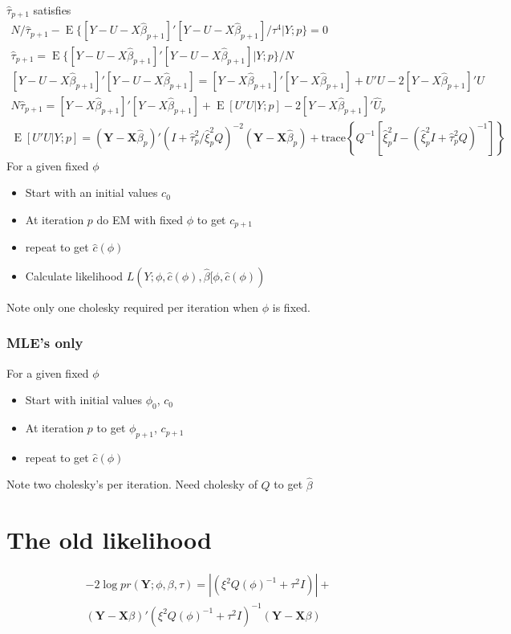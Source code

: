 \documentclass[12pt]{article}
\DeclareMathOperator{\E}{E}
\begin{document}
$\hat\tau_{p+1}$ satisfies
\begin{gather*}
N /\hat\tau_{p+1} -
\E\{[Y-U-X\hat\beta_{p+1}]'[Y-U-X\hat\beta_{p+1}]/\tau^4|Y;p\}=0\\
\hat\tau_{p+1} = \E\{[Y-U-X\hat\beta_{p+1}]'[Y-U-X\hat\beta_{p+1}]|Y;p\}/N\\
[Y-U-X\hat\beta_{p+1}]'[Y-U-X\hat\beta_{p+1}]=
[Y-X\hat\beta_{p+1}]'[Y-X\hat\beta_{p+1}]
+ U'U -2 [Y-X\hat\beta_{p+1}]' U \\
N \hat\tau_{p+1} = [Y-X\hat\beta_{p+1}]'[Y-X\hat\beta_{p+1}]+
\E[U'U|Y;p] - 2 [Y-X\hat\beta_{p+1}]' \hat U_p\\
\E[U'U|Y;p] = (\mathbf{Y} -
\mathbf{X}\hat\beta_p)' ( I + \hat\tau^2_p/\hat\xi^2_p Q  )^{-2}  (\mathbf{Y} -
\mathbf{X}\hat\beta_p) + \text{trace}\left\{ Q^{-1}\left[\hat\xi_p^2 I-
(\hat\xi_p^2  I + \hat\tau_p^2Q )^{-1} \right]\right\}
\end{gather*}
For a given fixed $\phi$
\begin{itemize}
  \item Start with an initial values  $c_0$
  \item At iteration $p$  do EM with fixed $\phi$ to get $c_{p+1}$
  \item repeat to get $\hat c(\phi)$
  \item Calculate likelihood
  $L(Y;\phi,\hat c(\phi), \hat\beta[\phi,\hat c(\phi)) $
\end{itemize}
Note only one cholesky required per iteration when $\phi$ is fixed.

\subsubsection*{MLE's only}
For a given fixed $\phi$
\begin{itemize}
  \item Start with initial values  $\phi_0$, $c_0$
  \item At iteration $p$  to get $\phi_{p+1}$, $c_{p+1}$
  \item repeat to get $\hat c(\phi)$
\end{itemize}
Note two cholesky's per iteration. Need cholesky of $Q$ to get $\hat\beta$



\section*{The old likelihood}
\begin{multline*}
-2 \log pr(\mathbf{Y};\phi,\beta,\tau) =
| (\xi^2  Q(\phi)^{-1} + \tau^2 I  ) | + \\
( \mathbf{Y} -\mathbf{X}\beta)  '
  (\xi^2  Q(\phi)^{-1} + \tau^2 I  )^{-1}
(\mathbf{Y} - \mathbf{X}\beta)
\end{multline*}
\end{document}
